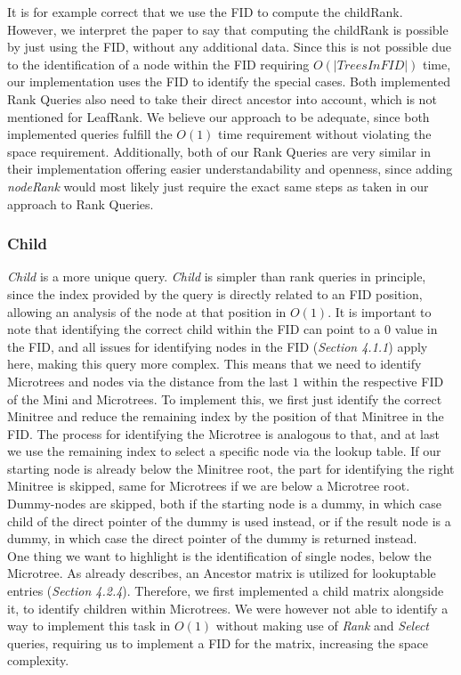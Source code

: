 \documentclass{article}
\begin{document}
It is for example correct that we use the FID to compute the childRank. However, we interpret the paper to say that computing the childRank is possible by just using the FID, without any additional data. 
Since this is not possible due to the identification of a node within the FID requiring $O(|Trees In FID|)$ time, our implementation uses the FID to identify the special cases. Both implemented Rank Queries also need to take their direct ancestor into account, which is not mentioned for LeafRank.
We believe our approach to be adequate, since both implemented queries fulfill the $O(1)$ time requirement without violating the space requirement. Additionally, both of our Rank Queries are very similar in their implementation offering easier understandability and openness, since adding \textit{nodeRank} would most likely just require the exact same steps as taken in our approach to Rank Queries.

\subsubsection{Child}
\textit{Child} is a more unique query. \textit{Child} is simpler than rank queries in principle, since the index provided by the query is directly related to an FID position, allowing an analysis of the node at that position in $O(1)$. It is important to note that identifying the correct child within the FID can point to a 0 value in the FID, and all issues for identifying nodes in the FID (\textit{Section 4.1.1}) apply here, making this query more complex.
This means that we need to identify Microtrees and nodes via the distance from the last $1$ within the respective FID of the Mini and Microtrees. To implement this, we first just identify the correct Minitree and reduce the remaining index by the position of that Minitree in the FID.
The process for identifying the Microtree is analogous to that, and at last we use the remaining index to select a specific node via the lookup table. If our starting node is already below the Minitree root, the part for identifying the right Minitree is skipped, same for Microtrees if we are below a Microtree root.
Dummy-nodes are skipped, both if the starting node is a dummy, in which case child of the direct pointer of the dummy is used instead, or if the result node is a dummy, in which case the direct pointer of the dummy is returned instead.\\
One thing we want to highlight is the identification of single nodes, below the Microtree. As \cite{farzanMunro} already describes, an Ancestor matrix is utilized for lookuptable entries (\textit{Section 4.2.4}). Therefore, we first implemented a child matrix alongside it, to identify children within Microtrees. We were however not able to identify a way to implement this task in $O(1)$ without making use of \textit{Rank} and \textit{Select} queries, requiring us to implement a FID for the matrix, increasing the space complexity.
\end{document}

